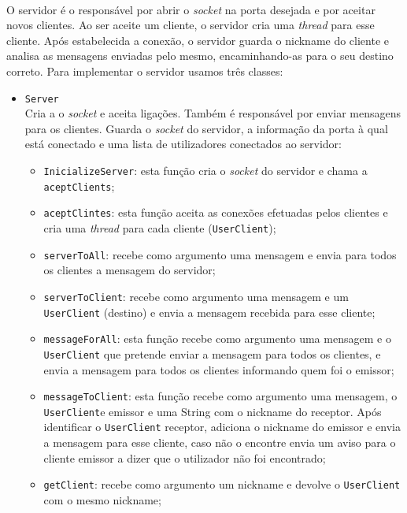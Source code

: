 \documentclass{article}
\begin{document}
\paragraph{}
O servidor é o responsável por abrir o \emph{socket} na porta desejada e por aceitar novos clientes. Ao ser aceite um cliente, o servidor cria uma \emph{thread} para esse cliente. 
Após estabelecida a conexão, o servidor guarda o nickname do cliente e analisa as mensagens enviadas pelo mesmo, encaminhando-as para o seu destino correto.
Para implementar o servidor usamos três classes:

\begin{itemize}
    \item   \verb|Server|\\
     Cria a o \emph{socket} e aceita ligações. Também é responsável por enviar mensagens para os clientes.
Guarda o \emph{socket} do servidor, a informação da porta à qual está conectado e uma lista de utilizadores conectados ao servidor:
    \begin{itemize}
        \item \verb|InicializeServer|: esta função cria o \emph{socket} do servidor e chama a \verb|aceptClients|;
        \item \verb|aceptClintes|: esta função aceita as conexões efetuadas pelos clientes e cria uma \emph{thread} para cada cliente (\verb|UserClient|);
        \item \verb|serverToAll|: recebe como argumento uma mensagem e envia para todos os clientes a mensagem do servidor;
        \item \verb|serverToClient|: recebe como argumento uma mensagem e um \verb|UserClient| (destino) e envia a mensagem recebida para esse cliente;
        \item \verb|messageForAll|: esta função recebe como argumento uma mensagem e o \verb|UserClient| que pretende enviar a mensagem para todos os clientes, e envia a mensagem para todos os clientes informando quem foi o emissor;
        \item \verb|messageToClient|: esta função recebe como argumento uma mensagem, o \verb|UserClient|e emissor e uma String com o nickname do receptor.  Após identificar o \verb|UserClient| receptor, adiciona o nickname do emissor e envia a mensagem para esse cliente, caso não o encontre envia um aviso para o cliente emissor a dizer que o utilizador não foi encontrado;
        \item \verb|getClient|: recebe como argumento um nickname e devolve o \verb|UserClient| com o mesmo nickname;

\end{itemize}
\end{itemize}
\end{document}

